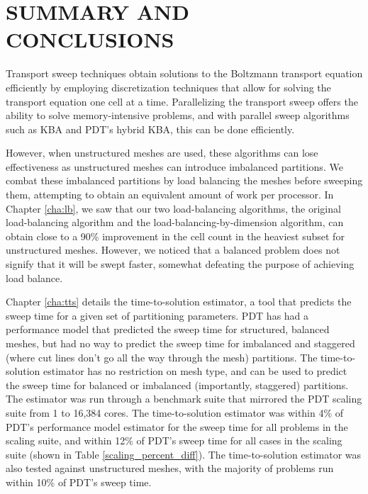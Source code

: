 %
%
%
%



\chapter{SUMMARY AND CONCLUSIONS \label{cha:Summary}}

Transport sweep techniques obtain solutions to the Boltzmann transport equation efficiently by employing discretization techniques that allow for solving the transport equation one cell at a time.
Parallelizing the transport sweep offers the ability to solve memory-intensive problems, and with parallel sweep algorithms such as KBA and PDT's hybrid KBA, this can be done efficiently.

However, when unstructured meshes are used, these algorithms can lose effectiveness as unstructured meshes can introduce imbalanced partitions.
We combat these imbalanced partitions by load balancing the meshes before sweeping them, attempting to obtain an equivalent amount of work per processor.
In Chapter \ref{cha:lb}, we saw that our two load-balancing algorithms, the original load-balancing algorithm and the load-balancing-by-dimension algorithm, can obtain close to a 90\% improvement in the cell count in the heaviest subset for unstructured meshes.
However, we noticed that a balanced problem  does not signify that it will be swept faster, somewhat defeating the purpose of achieving load balance.

Chapter \ref{cha:tts} details the time-to-solution estimator, a tool that predicts the sweep time for a given set of partitioning parameters.
PDT has had a performance model that predicted the sweep time for structured, balanced meshes, but had no way to predict the sweep time for imbalanced and staggered (where cut lines don't go all the way through the mesh) partitions.
The time-to-solution estimator has no restriction on mesh type, and can be used to predict the sweep time for balanced or imbalanced (importantly, staggered) partitions.
The estimator was run through a benchmark suite that mirrored the PDT scaling suite from 1 to 16,384 cores.
The time-to-solution estimator was within 4\% of PDT's performance model estimator for the sweep time for all problems in the scaling suite, and within 12\% of PDT's sweep time for all cases in the scaling suite (shown in Table \ref{scaling_percent_diff}).
The time-to-solution estimator was also tested against unstructured meshes, with the majority of problems run within 10\% of PDT's sweep time.

